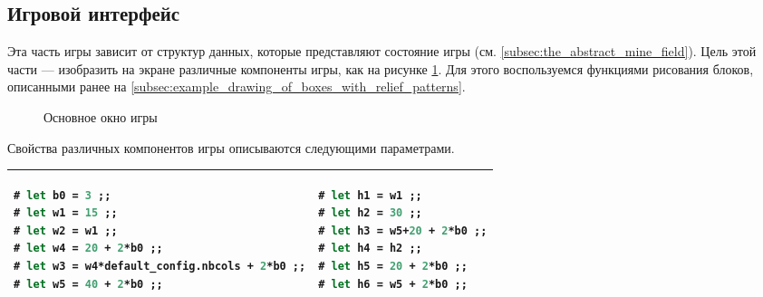 \subsection{Игровой интерфейс}
\label{subsec:displaying_the_minesweeper_game}

Эта часть игры зависит от структур данных, которые представляют состояние игры 
(см. \ref{subsec:the_abstract_mine_field}). Цель этой части --- изобразить на 
экране различные компоненты игры, как на рисунке 
\ref{fig:the_main_window_of_minesweeper}. Для этого воспользуемся функциями 
рисования блоков, описанными ранее на 
\ref{subsec:example_drawing_of_boxes_with_relief_patterns}.

\begin{figure}[h]
	\caption{\label{fig:the_main_window_of_minesweeper}Основное окно игры}
\end{figure}

Свойства различных компонентов игры описываются следующими параметрами. 

\begin{table}[hl]
\begin{center}
	\begin{tabular}{|p{7.2cm}|p{7.2cm}|}
	\hline
{\begin{lstlisting}[language=OCaml,frame=none]
# let b0 = 3 ;;
# let w1 = 15 ;;
# let w2 = w1 ;;
# let w4 = 20 + 2*b0 ;;
# let w3 = w4*default_config.nbcols + 2*b0 ;;
# let w5 = 40 + 2*b0 ;;
\end{lstlisting}}
 &
{\begin{lstlisting}[language=OCaml,frame=none]
# let h1 = w1 ;;
# let h2 = 30 ;;
# let h3 = w5+20 + 2*b0 ;;
# let h4 = h2 ;;
# let h5 = 20 + 2*b0 ;;
# let h6 = w5 + 2*b0 ;;
\end{lstlisting}}
\\
	\hline
	\end{tabular}
\end{center}
\end{table}

